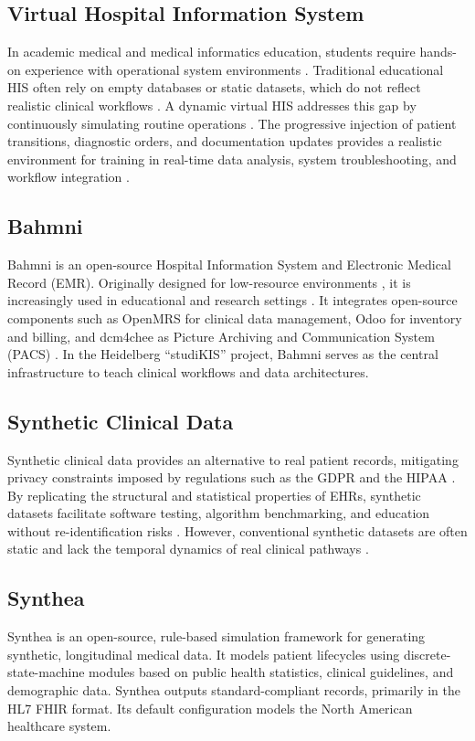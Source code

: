 \subsection*{Virtual Hospital Information System}
In academic medical and medical informatics education, students require hands-on experience with operational system environments \citep{BICHELFINDLAY2023104908}. Traditional educational HIS often rely on empty databases or static datasets, which do not reflect realistic clinical workflows \citep{choi2021}. A dynamic virtual HIS addresses this gap by continuously simulating routine operations \citep{MEDLOCK2023104907}. The progressive injection of patient transitions, diagnostic orders, and documentation updates provides a realistic environment for training in real-time data analysis, system troubleshooting, and workflow integration \citep{Mohan2016-qn}.

\subsection*{Bahmni}
Bahmni is an open-source Hospital Information System and Electronic Medical Record (EMR). Originally designed for low-resource environments \citep{Syzdykova2017-uf}, it is increasingly used in educational and research settings \citep{MEDLOCK2023104907}. It integrates open-source components such as OpenMRS for clinical data management, Odoo for inventory and billing, and dcm4chee as Picture Archiving and Communication System (PACS) \citep{Syzdykova2017-uf}. In the Heidelberg \enquote{studiKIS} project, Bahmni serves as the central infrastructure to teach clinical workflows and data architectures.

\subsection*{Synthetic Clinical Data}
Synthetic clinical data provides an alternative to real patient records, mitigating privacy constraints imposed by regulations such as the GDPR and the HIPAA \citep{Chen2021-ji}. By replicating the structural and statistical properties of EHRs, synthetic datasets facilitate software testing, algorithm benchmarking, and education without re-identification risks \citep{synthea}. However, conventional synthetic datasets are often static and lack the temporal dynamics of real clinical pathways \citep{Dahmen2019-tw}.

\subsection*{Synthea}
\begin{sloppypar}
Synthea is an open-source, rule-based simulation framework for generating synthetic, longitudinal medical data. It models patient lifecycles using discrete-state-machine modules based on public health statistics, clinical guidelines, and demographic data. Synthea outputs standard-compliant records, primarily in the HL7 FHIR format. Its default configuration models the North American healthcare system. \citep{synthea}
\end{sloppypar}

